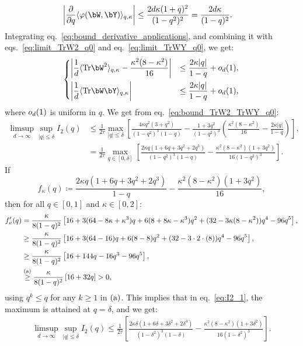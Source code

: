 {\begin{align}\label{eq:bound_derivative_applications}
    \left|\frac{\partial}{\partial q} \langle \varphi(\bW, \bY)\rangle_{q,\kappa}\right| 
    &\leq \frac{2 d \kappa (1+q)^2}{(1-q^2)^2} = \frac{2 d \kappa}{(1-q)^2}.
\end{align}
Integrating eq.~\eqref{eq:bound_derivative_applications}, and combining it with eqs.~\eqref{eq:limit_TrW2_q0} and eq.~\eqref{eq:limit_TrWY_q0}, we get:
\begin{align}\label{eq:bound_TrW2_TrWY_q0}
    \begin{dcases}
        \left|\frac{1}{d}\langle\Tr \bW^2\rangle_{q, \kappa} - \frac{\kappa^2 (8-\kappa^2)}{16} \right| &\leq \frac{2\kappa |q|}{1-q}  + \smallO_d(1), \\
        \left|\frac{1}{d}\langle\Tr \bW \bY\rangle_{q, \kappa} \right| &\leq \frac{2\kappa |q|}{1-q}  + \smallO_d(1),
    \end{dcases}
\end{align}
where $o_d(1)$ is uniform in $q$.
We get from eq.~\eqref{eq:bound_TrW2_TrWY_q0}: 
\begin{align}
    \label{eq:I2_1}
    \nonumber
    \limsup_{d \to \infty}\sup_{|q| \leq \delta} I_2(q) &\leq 
    \frac{1}{2\tau} \max_{|q| \leq \delta }\left[
        \frac{4 \kappa q^2(3+q^2)}{(1-q^2)^3(1-q)} - \frac{1+3q^2}{(1-q^2)^3} \left(\frac{\kappa^2(8 - \kappa^2)}{16} - \frac{2\kappa |q|}{1-q}\right)
    \right], \\ 
    &= 
    \frac{1}{2\tau} \max_{q \in [0, \delta]}\left[
        \frac{2 \kappa q(1+6q+3q^2+2q^3)}{(1-q^2)^3(1-q)} - \frac{\kappa^2 (8-\kappa^2)(1+3q^2)}{16 (1-q^2)^3}
    \right].
\end{align}
If 
\begin{equation*}
f_\kappa(q) \coloneqq \frac{2 \kappa q(1+6q+3q^2+2q^3)}{1-q} -  \frac{\kappa^2 (8-\kappa^2)(1+3q^2)}{16},
\end{equation*}
then for all $q \in [0,1]$ and $\kappa \in [0,2]$:
\begin{align}\label{eq:fprime_q}
    \nonumber
    f_\kappa'(q) &= \frac{\kappa}{8(1-q)^2} \left[16 + 3(64-8\kappa+\kappa^3)q + 6(8+8\kappa-\kappa^3)q^2 + (32-3\kappa(8-\kappa^2))q^4 - 96 q^5\right], \\ 
    \nonumber
    &\geq \frac{\kappa}{8(1-q)^2} \left[16 + 3(64-16)q + 6(8-8)q^2 + (32-3\cdot 2 \cdot(8))q^4 - 96 q^5\right], \\ 
    \nonumber
    &\geq \frac{\kappa}{8(1-q)^2} \left[16+144q-16q^3-96q^5\right], \\ 
    &\overset{\mathrm{(a)}}{\geq} \frac{\kappa}{8(1-q)^2} \left[16+32q\right] > 0,
\end{align}
using $q^k \leq q$ for any $k \geq 1$ in $(\rm a)$.
This implies that in eq.~\eqref{eq:I2_1}, the maximum is attained at $q = \delta$, and we get:
\begin{align}\label{eq:ub_I2}
    \limsup_{d \to \infty} \sup_{|q| \leq \delta} I_2(q) 
    \leq
    \frac{1}{2\tau} \left[
        \frac{2 \kappa \delta(1+6\delta+3\delta^2+2\delta^3)}{(1-\delta^2)^3(1-\delta)} - \frac{\kappa^2 (8-\kappa^2)(1+3\delta^2)}{16 (1-\delta^2)^3}
    \right].
\end{align}

}
